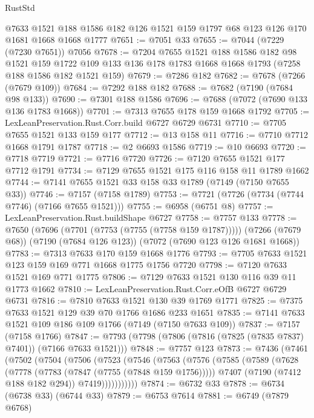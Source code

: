 \begin{lexlean}{RustStd}
\begin{coremodule}
    @7633
    @1521
    @188
    @1586
    @182
    @126
    @1521
    @159
    @1797
    @68
    @123
    @126
    @170
    @1681
    @1668
    @1668
    @1777
@7651 := @7051 @33
@7655 := @7044 (@7229 (@7230 @7651)) @7056
@7678 := @7204
    @7655
    @1521
    @188
    @1586
    @182
    @98
    @1521
    @159
    @1722
    @109
    @133
    @136
    @178
    @1783
    @1668
    @1668
    @1793
    (@7258 @188 @1586 @182 @1521 @159)
@7679 := @7286 @182
@7682 := @7678 (@7266 (@7679 @109))
@7684 := @7292 @188 @182
@7688 := @7682 (@7190 (@7684 @98 @133))
@7690 := @7301 @188 @1586
@7696 := @7688 (@7072 (@7690 @133 @136 @1783 @1668))
@7701 := @7313 @7655 @178 @159 @1668 @1792
@7705 := LexLeanPreservation.Rust.Corr.build @6727 @6729 @6731
@7710 := @7705 @7655 @1521 @133 @159 @177
@7712 := @13 @158 @11
@7716 := @7710 @7712 @1668 @1791 @1787
@7718 := @2 @6693 @1586
@7719 := @10 @6693
@7720 := @7718 @7719
@7721 := @7716 @7720
@7726 := @7120 @7655 @1521 @177 @7712 @1791
@7734 := @7129 @7655 @1521 @175 @116 @158 @11 @1789 @1662
@7744 := @7141 @7655 @1521 @33 @158 @33 @1789 (@7149 (@7150 @7655 @33))
@7746 := @7157 (@7158 @1789)
@7753 := @7721 (@7726 (@7734 (@7744 @7746) (@7166 @7655 @1521)))
@7755 := @6958 (@6751 @8)
@7757 := LexLeanPreservation.Rust.buildShape @6727
@7758 := @7757 @133
@7778 := @7650
    (@7696 (@7701 (@7753 (@7755 (@7758 @159 @1787)))))
    (@7266 (@7679 @68))
    (@7190 (@7684 @126 @123))
    (@7072 (@7690 @123 @126 @1681 @1668))
@7783 := @7313 @7633 @170 @159 @1668 @1776
@7793 := @7705 @7633 @1521 @123 @159 @169 @771 @1668 @1775 @1756 @7720
@7798 := @7120 @7633 @1521 @169 @771 @1775
@7806 := @7129 @7633 @1521 @130 @116 @39 @11 @1773 @1662
@7810 := LexLeanPreservation.Rust.Corr.eOfB @6727 @6729 @6731
@7816 := @7810 @7633 @1521 @130 @39 @1769 @1771
@7825 := @7375 @7633 @1521 @129 @39 @70 @1766 @1686 @233 @1651
@7835 := @7141 @7633 @1521 @109 @186 @109 @1766 (@7149 (@7150 @7633 @109))
@7837 := @7157 (@7158 @1766)
@7847 := @7793 (@7798 (@7806 (@7816 (@7825 (@7835 @7837) @7401)) (@7166 @7633 @1521)))
@7848 := @7757 @123
@7873 := @7436
    (@7461
      (@7502
        (@7504
          (@7506
            (@7523
              (@7546
                (@7563
                  (@7576
                    (@7585
                      (@7589
                        (@7628
                          (@7778 (@7783 (@7847 (@7755 (@7848 @159 @1756)))))
                          @7407
                          (@7190 (@7412 @188 @182 @294))
                          @7419)))))))))))
@7874 := @6732 @33
@7878 := @6734 (@6738 @33) (@6744 @33)
@7879 := @6753 @7614
@7881 := @6749 (@7879 @6768)

\end{coremodule}
\end{lexlean}
